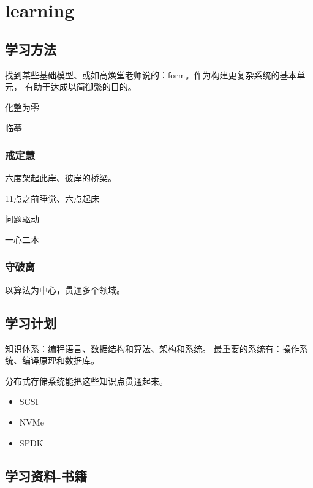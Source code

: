 \chapter{learning}

\section{学习方法}

找到某些基础模型、或如高焕堂老师说的：form。作为构建更复杂系统的基本单元，
有助于达成以简御繁的目的。

化整为零

临摹

\subsection{戒定慧}

六度架起此岸、彼岸的桥梁。

\begin{enumbox}
\item 11点之前睡觉、六点起床
\item 问题驱动
\item 一心二本
\end{enumbox}

\subsection{守破离}

以算法为中心，贯通多个领域。


\section{学习计划}

知识体系：编程语言、数据结构和算法、架构和系统。
最重要的系统有：操作系统、编译原理和数据库。

分布式存储系统能把这些知识点贯通起来。

\begin{itemize}
    \item SCSI
    \item NVMe
    \item SPDK
\end{itemize}

\section{学习资料-书籍}

